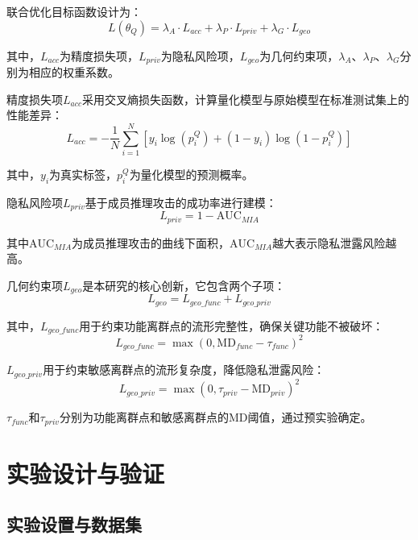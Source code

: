 联合优化目标函数设计为：
\begin{equation}
L(\theta_Q) = \lambda_A \cdot L_{acc} + \lambda_P \cdot L_{priv} + \lambda_G \cdot L_{geo}
\end{equation}

其中，$L_{acc}$为精度损失项，$L_{priv}$为隐私风险项，$L_{geo}$为几何约束项，$\lambda_A$、$\lambda_P$、$\lambda_G$分别为相应的权重系数。

精度损失项$L_{acc}$采用交叉熵损失函数，计算量化模型与原始模型在标准测试集上的性能差异：
\begin{equation}
L_{acc} = -\frac{1}{N}\sum_{i=1}^N [y_i \log(p_i^Q) + (1-y_i) \log(1-p_i^Q)]
\end{equation}

其中，$y_i$为真实标签，$p_i^Q$为量化模型的预测概率。

隐私风险项$L_{priv}$基于成员推理攻击的成功率进行建模：
\begin{equation}
L_{priv} = 1 - \text{AUC}_{MIA}
\end{equation}

其中$\text{AUC}_{MIA}$为成员推理攻击的曲线下面积，$\text{AUC}_{MIA}$越大表示隐私泄露风险越高。

几何约束项$L_{geo}$是本研究的核心创新，它包含两个子项：
\begin{equation}
L_{geo} = L_{geo\_func} + L_{geo\_priv}
\end{equation}

其中，$L_{geo\_func}$用于约束功能离群点的流形完整性，确保关键功能不被破坏：
\begin{equation}
L_{geo\_func} = \max(0, \text{MD}_{func} - \tau_{func})^2
\end{equation}

$L_{geo\_priv}$用于约束敏感离群点的流形复杂度，降低隐私泄露风险：
\begin{equation}
L_{geo\_priv} = \max(0, \tau_{priv} - \text{MD}_{priv})^2
\end{equation}

$\tau_{func}$和$\tau_{priv}$分别为功能离群点和敏感离群点的MD阈值，通过预实验确定。

\section{实验设计与验证}

\subsection{实验设置与数据集}

